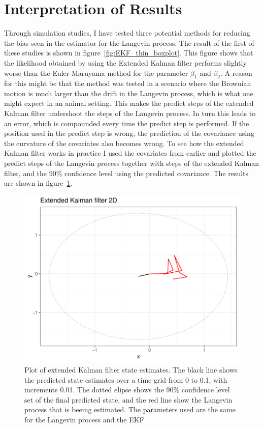 

\section{Interpretation of Results}

Through simulation studies, I have tested three potential methods for reducing the bias seen in the \parencite{michelot_langevin_2019} estimator for the Langevin process. The result of the first of these studies is shown in figure~\ref{fig:EKF_thin_boxplot}. This figure shows that the likelihood obtained by using the Extended Kalman filter performs slightly worse than the Euler-Maruyama method for the parameter $\beta_1$ and $\beta_2$. A reason for this might be that the method was tested in a scenario where the Brownian motion is much larger than the drift in the Langevin process, which is what one might expect in an animal setting. This makes the predict steps of the extended Kalman filter undershoot the steps of the Langevin process. In turn this leads to an error, which is compounded every time the predict step is performed. If the position used in the predict step is wrong, the prediction of the covariance using the curvature of the covariates also becomes wrong. To see how the extended Kalman filter works in practice I used the covariates from earlier and plotted the predict steps of the Langevin process together with steps of the extended Kalman filter, and the 90\% confidence level using the predicted covariance. The results are shown in figure~\ref{fig:EKF high diffusion}. 


\begin{figure}[H]
    \centering
    \includegraphics[width=\linewidth]{Images/discussion/EKF high diffusion path.pdf}
    \caption[Extended Kalman filter]{Plot of extended Kalman filter state estimates. The black line shows the predicted state estimates over a time grid from 0 to 0.1, with increments 0.01. The dotted elipse shows the 90\% confidence level set of the final predicted state, and the red line show the Langevin process that is beeing estimated. The parameters used are the same for the Langevin process and the EKF}
    \label{fig:EKF high diffusion}
\end{figure}


